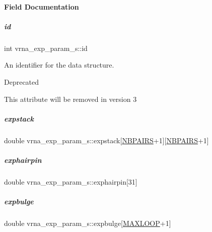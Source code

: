 \paragraph{Field Documentation}
\mbox{\label{group__energy__parameters_a378d5bcf2bae1f3ec84c912c7d3908d2}} 
\subparagraph{\texorpdfstring{id}{id}}
{\footnotesize\ttfamily int vrna\+\_\+exp\+\_\+param\+\_\+s\+::id}



An identifier for the data structure. 

\begin{DoxyRefDesc}{Deprecated}
\item[\mbox{\hyperlink{deprecated__deprecated000101}{Deprecated}}]This attribute will be removed in version 3 \end{DoxyRefDesc}
\mbox{\label{group__energy__parameters_a0b288e466e25d1c4f45d138236b5a544}} 
\subparagraph{\texorpdfstring{expstack}{expstack}}
{\footnotesize\ttfamily double vrna\+\_\+exp\+\_\+param\+\_\+s\+::expstack\mbox{[}\mbox{\hyperlink{energy__const_8h_a5e75221c779d618eab81e096f37e32ce}{N\+B\+P\+A\+I\+RS}}+1\mbox{]}\mbox{[}\mbox{\hyperlink{energy__const_8h_a5e75221c779d618eab81e096f37e32ce}{N\+B\+P\+A\+I\+RS}}+1\mbox{]}}

\mbox{\label{group__energy__parameters_a7d770c6dbf7bd37b91f56600d387b0cd}} 
\subparagraph{\texorpdfstring{exphairpin}{exphairpin}}
{\footnotesize\ttfamily double vrna\+\_\+exp\+\_\+param\+\_\+s\+::exphairpin\mbox{[}31\mbox{]}}

\mbox{\label{group__energy__parameters_a7f2f16246bbfc5b009e4c34113dcacd7}} 
\subparagraph{\texorpdfstring{expbulge}{expbulge}}
{\footnotesize\ttfamily double vrna\+\_\+exp\+\_\+param\+\_\+s\+::expbulge\mbox{[}\mbox{\hyperlink{energy__const_8h_ad1bd6eabac419670ddd3c9ed82145988}{M\+A\+X\+L\+O\+OP}}+1\mbox{]}}

